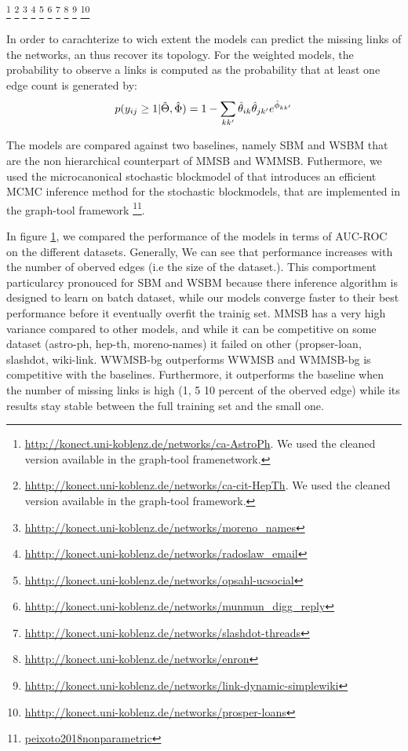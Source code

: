 \textcolor{white}{ %
\footnote{\url{http://konect.uni-koblenz.de/networks/ca-AstroPh}. We used the cleaned version available in the  graph-tool framenetwork.}
\footnote{\url{hhttp://konect.uni-koblenz.de/networks/ca-cit-HepTh}. We used the cleaned version available in the  graph-tool framework.}
\footnote{\url{hhttp://konect.uni-koblenz.de/networks/moreno_names}}
\footnote{\url{hhttp://konect.uni-koblenz.de/networks/radoslaw_email}}
\footnote{\url{hhttp://konect.uni-koblenz.de/networks/opsahl-ucsocial}}
\footnote{\url{hhttp://konect.uni-koblenz.de/networks/munmun_digg_reply}}
\footnote{\url{hhttp://konect.uni-koblenz.de/networks/slashdot-threads}}
\footnote{\url{hhttp://konect.uni-koblenz.de/networks/enron}}
\footnote{\url{hhttp://konect.uni-koblenz.de/networks/link-dynamic-simplewiki}}
\footnote{\url{hhttp://konect.uni-koblenz.de/networks/prosper-loans}}
}


\begin{figure}[h]
\centering
	
   \label{fig:roc}
\end{figure}


In order to carachterize to wich extent the models can predict the missing links of the networks, an thus recover its topology. For the weighted models, the probability to observe a links is computed as the probability that at least one edge count is generated by:
\begin{equation*}
p(y_{ij} \geq 1 | \hat\Theta, \hat\Phi) = 1 - \sum_{kk'} \hat\theta_{ik} \hat\theta_{jk'} e^{\hat\phi_{kk'}}
\end{equation*}

The models are compared against two baselines, namely SBM and WSBM that are the non hierarchical counterpart of MMSB and WMMSB. Futhermore, we used the microcanonical stochastic blockmodel of \cite{peixoto2018nonparametric} that introduces an efficient MCMC inference method for the stochastic blockmodels, that are implemented in the graph-tool framework \footnote{\url{peixoto2018nonparametric}}.

In figure \ref{fig:roc}, we compared the performance of the models in terms of AUC-ROC on the different datasets. Generally,  We can see that performance increases with the number of oberved edges (i.e the size of the dataset.). This comportment particularcy pronouced for SBM and WSBM because there inference algorithm is designed to learn on batch dataset, while our models converge faster to their best performance  before it eventually overfit the trainig set. MMSB has a very high variance compared to other models, and while it can be competitive on some dataset (astro-ph, hep-th, moreno-names) it failed on other (propser-loan, slashdot, wiki-link. WWMSB-bg outperforms WWMSB and WMMSB-bg is competitive with the baselines. Furthermore, it outperforms the baseline when the number of missing links is high (1, 5 10 percent of the oberved edge) while its results stay stable between the full training set and the small one.



